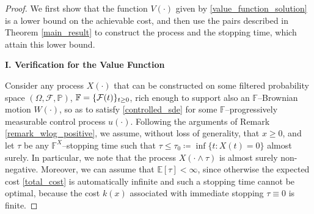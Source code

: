 \documentclass[11pt,tbtags,reqno]{article}
\theoremstyle{definition}
\numberwithin{equation}{section}
\theoremstyle{definition}
\newcommand{\pr}{\mathbb{P}}
\newcommand{\ex}{\mathbb{E}}
\begin{document}
\begin{proof}
We first show that the function $V(\cdot)$ given by \eqref{value_function_solution} is a lower bound on the achievable cost, and then use the pairs described in Theorem \ref{main_result} to construct the process and the stopping time, which attain this lower bound. 

\noindent
\textbf{I. Verification for the Value Function}

Consider any process $X(\cdot)$ that can be constructed on some filtered probability space $(\Omega, \mathcal{F}, \pr)$, $\mathbb{F} \nobreak= \{\mathcal{F}(t)\}_{t \ge 0}$, rich enough to support also an $\mathbb{F}$--Brownian motion $W(\cdot)$, so as to satisfy \eqref{controlled_sde} for some $\mathbb{F}$--progressively measurable control process $u(\cdot)$. 
Following the arguments of Remark \ref{remark_wlog_positive}, we assume, without loss of generality, that $x \ge 0$, and let $\tau$ be any $\mathbb{F}^X$--stopping time such that $\tau \le \tau_0 \coloneqq \inf\{t: X(t) = 0\}$ almost surely. In particular, we note that the process $X(\cdot \wedge \tau)$ is almost surely non-negative. Moreover, we can assume that $\ex[\tau] < \infty$, since otherwise the expected cost \eqref{total_cost} is automatically infinite and such a stopping time cannot be optimal, because the cost $k(x)$ associated with immediate stopping $\tau \equiv 0$ is finite.


\end{proof}
\end{document}
